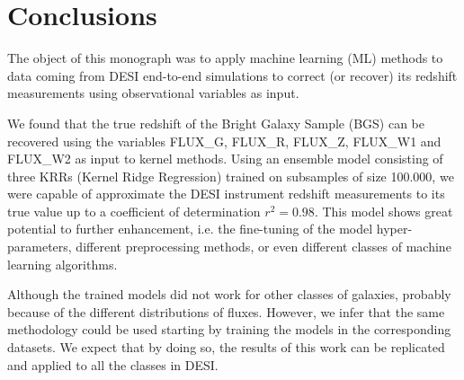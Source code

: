 \chapter{Conclusions}
\label{Ch:conclusion}

The object of this monograph was to apply machine learning (ML) methods to data coming from DESI end-to-end simulations to correct (or recover) its redshift measurements using observational variables as input. 

We found that the true redshift of the Bright Galaxy Sample (BGS) can be recovered using the variables FLUX\_G, FLUX\_R, FLUX\_Z, FLUX\_W1 and FLUX\_W2 as input to kernel methods. Using an ensemble model consisting of three KRRs (Kernel Ridge Regression) trained on subsamples of size 100.000, we were capable of approximate the DESI instrument redshift measurements to its true value up to a coefficient of determination $r^2 = 0.98$.  This model shows great potential to further enhancement, i.e. the fine-tuning of the model hyper-parameters, different preprocessing methods, or even different classes of machine learning algorithms.

Although the trained models did not work for other classes of galaxies, probably because of the different distributions of fluxes. However, we infer that the same methodology could be used starting by training the models in the corresponding datasets. We expect that by doing so, the results of this work can be replicated and applied to all the classes in DESI. 